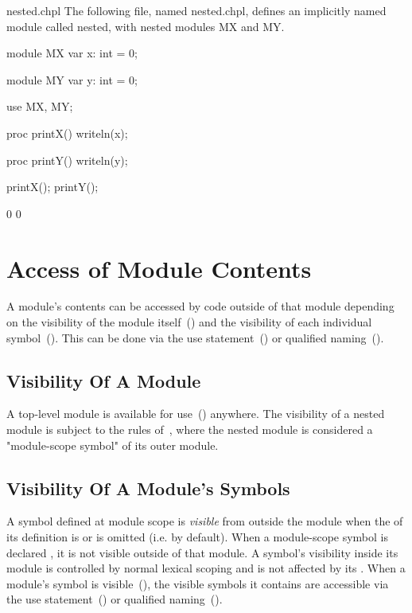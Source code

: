 \begin{chapelexample}{nested.chpl}
The following file, named nested.chpl, defines an
implicitly named module called nested, with nested modules
MX and MY.
\begin{chapel}
module MX {
  var x: int = 0;
}

module MY {
  var y: int = 0;
}

use MX, MY;

proc printX() {
  writeln(x);
}

proc printY() {
  writeln(y);
}
\end{chapel}
\begin{chapelpost}
printX();
printY();
\end{chapelpost}
\begin{chapeloutput}
0
0
\end{chapeloutput}
\end{chapelexample}


\section{Access of Module Contents}
\label{Access_Of_Module_Contents}

A module's contents can be accessed by code outside of that module
depending on the visibility of the module
itself~() and the visibility of each
individual symbol~().  This can be done
via the use statement~() or qualified
naming~().

\subsection{Visibility Of A Module}
\label{Visibility_Of_A_Module}

A top-level module is available for use~() anywhere. The
visibility of a nested module is subject to the rules
of~, where the nested module is considered
a "module-scope symbol" of its outer module.

\subsection{Visibility Of A Module's Symbols}
\label{Visibility_Of_Symbols}

A symbol defined at module scope is \emph{visible} from outside the
module when the  of its definition
is  or is omitted (i.e. by default). When a module-scope
symbol is declared
, it is not visible outside of that module. A
symbol's visibility inside its module is controlled by normal lexical
scoping and is not affected by its .  When a
module's symbol is visible~(), the
visible symbols it contains are accessible via the use
statement~() or qualified
naming~().

